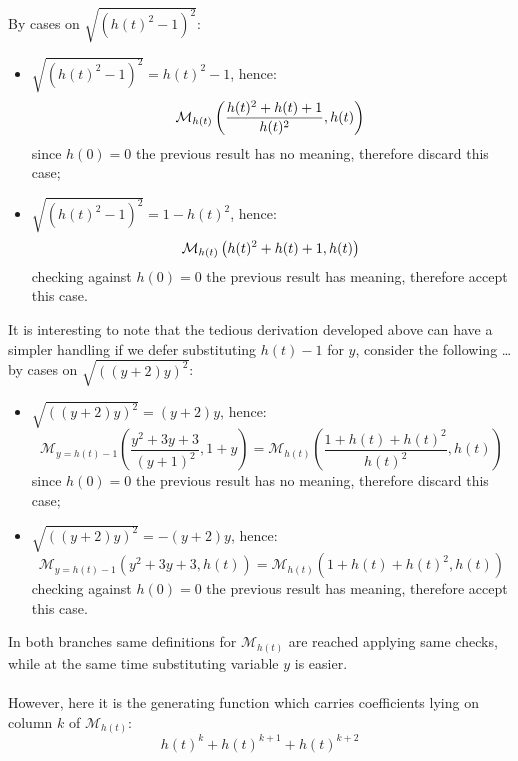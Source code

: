 By cases on $\sqrt{\left(h(t)^2 - 1\right)^{2}}$:
\begin{itemize}
    \item $\sqrt{\left(h(t)^2 - 1\right)^{2}}= h(t)^2 - 1$, hence:
        \begin{displaymath} 
            \mathcal{M}_{h(t)}\left(\frac{ h(t)^{2} + h(t) + 1}{h(t)^{2}} , h(t) \right)\\
        \end{displaymath} 
        since $h(0)=0$ the previous result has no meaning, therefore discard this case;
    \item $\sqrt{\left(h(t)^2 - 1\right)^{2}}= 1-h(t)^2$, hence:
        \begin{displaymath} 
            \mathcal{M}_{h(t)}\left( h(t)^{2} + h(t) + 1, h(t) \right)\\
        \end{displaymath} 
        checking against $h(0)=0$ the previous result has meaning, therefore accept this case.
\end{itemize}

It is interesting to note that the tedious derivation developed above can have
a simpler handling if we defer substituting $h(t)-1$ for $y$, consider the following \ldots
by cases on $\sqrt{\left(\left(y + 2\right) y\right)^{2}}$:
\begin{itemize}
    \item $\sqrt{\left(\left(y + 2\right) y\right)^{2}}=\left(y + 2\right) y$, hence:
        \begin{displaymath} 
            \mathcal{M}_{y=h(t)-1}\left(\frac{y^{2} + 3y + 3}{{\left(y + 1\right)}^{2}} , 1+y \right) = 
                \mathcal{M}_{h(t)}\left( \frac{1+h(t)+h(t)^2}{h(t)^2}, h(t) \right) 
        \end{displaymath} 
        since $h(0)=0$ the previous result has no meaning, therefore discard this case;
    \item $\sqrt{\left(\left(y + 2\right) y\right)^{2}}=-\left(y + 2\right) y$, hence:
        \begin{displaymath} 
            \mathcal{M}_{y=h(t)-1}\left(y^{2} + 3y + 3 , h(t) \right) = 
                \mathcal{M}_{h(t)}\left( 1+h(t)+h(t)^2, h(t) \right) 
        \end{displaymath} 
        checking against $h(0)=0$ the previous result has meaning, therefore accept this case.
\end{itemize}

In both branches same definitions for $\mathcal{M}_{h(t)}$ are reached applying
same checks, while at the same time substituting variable $y$ is easier. 
\\\\
However, here it is the generating function which carries coefficients 
lying on column $k$ of $\mathcal{M}_{h(t)}$:
\begin{displaymath} 
    h(t)^{k}+h(t)^{k+1}+h(t)^{k+2}
\end{displaymath} 


